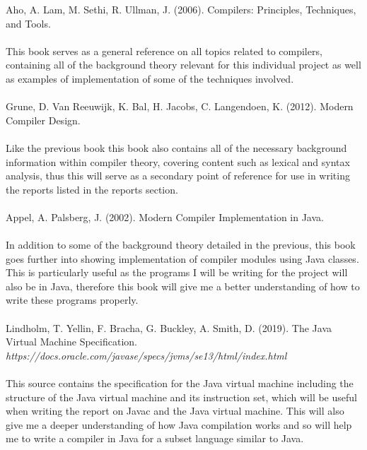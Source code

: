 \documentclass[a4paper, 11pt]{article}
\begin{document}
\textbullet\space  Aho, A. Lam, M. Sethi, R. Ullman, J. (2006). Compilers: Principles, Techniques, and Tools.
\\
\\
This book serves as a general reference on all topics related to compilers, containing all of the background theory relevant for this individual project as well as examples of implementation of some of the techniques involved.
\\
\\

\textbullet\space Grune, D.  Van Reeuwijk, K. Bal, H. Jacobs, C. Langendoen, K. (2012). Modern Compiler Design.
\\
\\
Like the previous book this book also contains all of the necessary background information within compiler theory, covering content such as lexical and syntax analysis, thus this will serve as a secondary point of reference for use in writing the reports listed in the reports section.
\\
\\

\textbullet\space Appel, A. Palsberg, J. (2002). Modern Compiler Implementation in Java.
\\
\\
In addition to some of the background theory detailed in the previous, this book goes further into showing implementation of compiler modules using Java classes. This is particularly useful as the programs I will be writing for the project will also be in Java, therefore this book will give me a better understanding of how to write these programs properly.
\\
\\

\textbullet\space Lindholm, T. Yellin, F. Bracha, G. Buckley, A. Smith, D. (2019). The Java Virtual Machine Specification.
\\
\textit{https://docs.oracle.com/javase/specs/jvms/se13/html/index.html}
\\
\\
This source contains the specification for the Java virtual machine including the structure of the Java virtual machine and its instruction set, which will be useful when writing the report on Javac and the Java virtual machine. This will also give me a deeper understanding of how Java compilation works and so will help me to write a compiler in Java for a subset language similar to Java.
\end{document}
